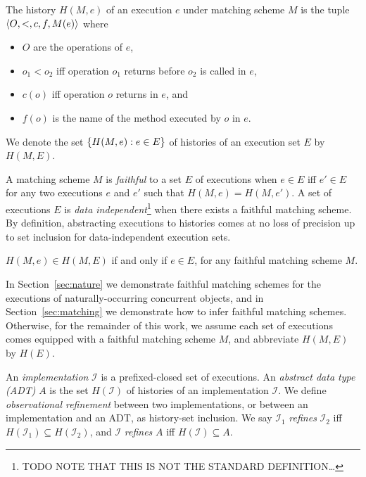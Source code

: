 The history $H(M,e)$ of an execution $e$ under matching scheme $M$ is the tuple
${\left\langle{O,<,c,f,M(e)}\right\rangle}$ where
\begin{itemize}

  \item $O$ are the operations of $e$,

  \item $o_1 < o_2$ if{f} operation $o_1$ returns before $o_2$ is called in $e$,

  \item $c(o)$ if{f} operation $o$ returns in $e$, and

  \item $f(o)$ is the name of the method executed by $o$ in $e$.

\end{itemize}
We denote the set ${\{{H(M,e) : e \in E}\}}$ of histories of an execution set $E$
by $H(M,E)$.

A matching scheme $M$ is \emph{faithful} to a set $E$ of executions when $e \in
E$ if{f} $e' \in E$ for any two executions $e$ and $e'$ such that $H(M,e) =
H(M,e')$. A set of executions $E$ is \emph{data independent}\footnote{TODO NOTE
THAT THIS IS NOT THE STANDARD DEFINITION…} when there exists a faithful
matching scheme. By definition, abstracting executions to histories comes at no
loss of precision up to set inclusion for data-independent execution sets.

\begin{lemma}

  $H(M,e) \in H(M,E)$ if and only if $e \in E$, for any faithful matching
  scheme $M$.

\end{lemma}

In Section~\ref{sec:nature} we demonstrate faithful matching schemes for the
executions of naturally-occurring concurrent objects, and in
Section~\ref{sec:matching} we demonstrate how to infer faithful matching
schemes. Otherwise, for the remainder of this work, we assume each set of
executions comes equipped with a faithful matching scheme $M$, and abbreviate
$H(M,E)$ by $H(E)$.

An \emph{implementation} $\mathcal{I}$ is a prefixed-closed set of executions.
An \emph{abstract data type (ADT)} $A$ is the set $H(\mathcal{I})$ of histories
of an implementation $\mathcal{I}$. We define \emph{observational refinement}
between two implementations, or between an implementation and an ADT, as
history-set inclusion. We say $\mathcal{I}_1$ \emph{refines} $\mathcal{I}_2$
if{f} $H(\mathcal{I}_1) \subseteq H(\mathcal{I}_2)$, and $\mathcal{I}$
\emph{refines} $A$ if{f} $H(\mathcal{I}) \subseteq A$.

